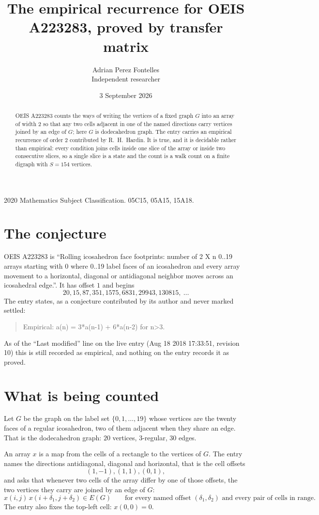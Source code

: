 \documentclass[11pt,a4paper]{article}
\title{The empirical recurrence for OEIS A223283, proved by transfer matrix}
\author{Adrian Perez Fontelles\\ \small Independent researcher}
\date{3 September 2026}
\theoremstyle{plain}
\theoremstyle{definition}
\begin{document}
\maketitle

\begin{abstract}
OEIS A223283 counts the ways of writing the vertices of a fixed graph $G$ into an array of width
$2$ so that any two cells adjacent in one of the named directions carry vertices joined by an
edge of $G$; here $G$ is dodecahedron graph. The entry carries an empirical recurrence of order $2$
contributed by R.~H.~Hardin. It is true, and it is decidable rather than empirical: every
condition joins cells inside one slice of the array or inside two consecutive slices, so a
single slice is a state and the count is a walk count on a finite digraph with $S=154$ vertices.
\end{abstract}

\noindent\small 2020 Mathematics Subject Classification. 05C15, 05A15, 15A18.\normalsize

\section{The conjecture}

OEIS A223283 is ``Rolling icosahedron face footprints: number of 2 X n 0..19 arrays starting with 0 where 0..19 label faces of an icosahedron and every array movement to a horizontal, diagonal or antidiagonal neighbor moves across an icosahedral edge.''. It has offset $1$ and begins
\[
20, 15, 87, 351, 1575, 6831, 29943, 130815,\ \dots
\]
The entry states, as a conjecture contributed by its author and never marked settled:
\begin{quote}
Empirical: a(n) = 3*a(n-1) + 6*a(n-2) for n>3.
\end{quote}
As of the ``Last modified'' line on the live entry (Aug 18 2018 17:33:51, revision 10) this is still
recorded as empirical, and nothing on the entry records it as proved.

\section{What is being counted}

Let $G$ be the graph on the label set $\{0,1,\dots,19\}$ whose vertices are the twenty faces of a regular icosahedron, two of them adjacent when they share an edge. That is the dodecahedron graph: $20$ vertices, $3$-regular, $30$ edges.

An array $x$ is a map from the cells of a rectangle to the vertices of $G$. The entry names the
directions antidiagonal, diagonal and horizontal, that is the cell offsets
\[
(1,-1), (1,1), (0,1),
\]
and asks that whenever two cells of the array differ by one of those offsets, the two vertices
they carry are joined by an edge of $G$:
\[
x(i,j)\,x(i+\delta_1,j+\delta_2)\in E(G)\qquad
\text{for every named offset } (\delta_1,\delta_2)\text{ and every pair of cells in range.}
\]
The entry also fixes the top-left cell: $x(0,0)=0$.
\end{document}
